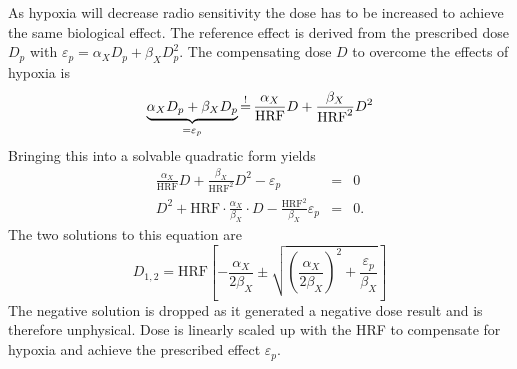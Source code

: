 %
As hypoxia will decrease radio sensitivity the dose has to be increased to achieve the same biological effect. The reference effect is derived from the prescribed dose $D_p$ with $\varepsilon_p = \alpha_X D_p + \beta_X D_p^2$. The compensating dose $D$ to overcome the effects of hypoxia is
\begin{equation}
\underbrace{\alpha_X D_p + \beta_X D_p}_{=\varepsilon_p} \mathop{=}\limits^! \frac{\alpha_X}{\mathrm{HRF}} D + \frac{\beta_X}{\mathrm{HRF}^2} D^2\\
\end{equation}
Bringing this into a solvable quadratic form yields
\begin{eqnarray}
\frac{\alpha_X}{\mathrm{HRF}} D + \frac{\beta_X}{\mathrm{HRF}^2} D^2 - \varepsilon_p  &=& 0\\
D^2 + \mathrm{HRF}\cdot\frac{\alpha_X}{\beta_X}\cdot D - \frac{\mathrm{HRF}^2}{\beta_X}\varepsilon_p &=& 0.
\end{eqnarray}
The two solutions to this equation are
\begin{equation}
D_{1,2} = \mathrm{HRF}\left[-\frac{\alpha_X}{2\beta_X} \pm \sqrt{\left(\frac{\alpha_X}{2\beta_X}\right)^2 + \frac{\varepsilon_p}{\beta_X}}\right]
\end{equation}
The negative solution is dropped as it generated a negative dose result and is therefore unphysical. Dose is linearly scaled up with the HRF to compensate for hypoxia and achieve the prescribed effect $\varepsilon_p$. 
